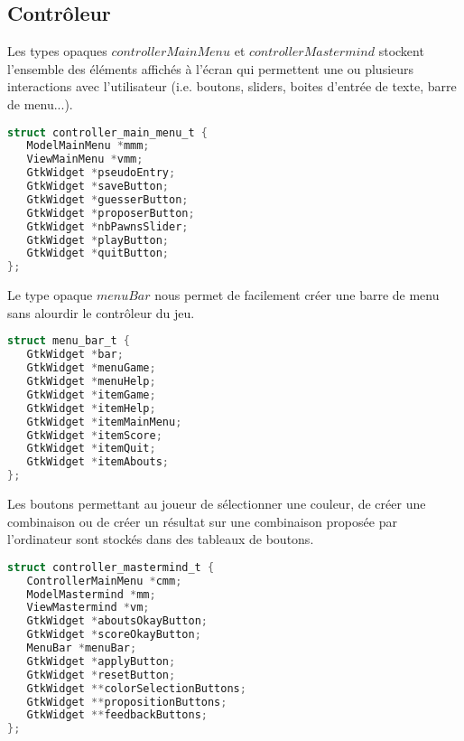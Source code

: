 \subsection{Contrôleur}

Les types opaques $controllerMainMenu$ et $controllerMastermind$ stockent l'ensemble des éléments affichés à l'écran qui permettent une ou plusieurs interactions avec l'utilisateur (i.e. boutons, sliders, boites d'entrée de texte, barre de menu...).

\begin{lstlisting}[language=C]
struct controller_main_menu_t {
   ModelMainMenu *mmm;
   ViewMainMenu *vmm;
   GtkWidget *pseudoEntry;
   GtkWidget *saveButton;
   GtkWidget *guesserButton;
   GtkWidget *proposerButton;
   GtkWidget *nbPawnsSlider;
   GtkWidget *playButton;
   GtkWidget *quitButton;
};
\end{lstlisting}

Le type opaque $menuBar$ nous permet de facilement créer une barre de menu sans alourdir le contrôleur du jeu. 

\begin{lstlisting}[language=C]
struct menu_bar_t {
   GtkWidget *bar;
   GtkWidget *menuGame;
   GtkWidget *menuHelp;
   GtkWidget *itemGame;
   GtkWidget *itemHelp;
   GtkWidget *itemMainMenu;
   GtkWidget *itemScore;
   GtkWidget *itemQuit;
   GtkWidget *itemAbouts;
};
\end{lstlisting}

Les boutons permettant au joueur de sélectionner une couleur, de créer une combinaison ou de créer un résultat sur une combinaison proposée par l'ordinateur sont stockés dans des tableaux de boutons. 

\begin{lstlisting}[language=C]
struct controller_mastermind_t {
   ControllerMainMenu *cmm;
   ModelMastermind *mm;
   ViewMastermind *vm;
   GtkWidget *aboutsOkayButton;
   GtkWidget *scoreOkayButton;
   MenuBar *menuBar;
   GtkWidget *applyButton;
   GtkWidget *resetButton;
   GtkWidget **colorSelectionButtons;
   GtkWidget **propositionButtons;
   GtkWidget **feedbackButtons;
};
\end{lstlisting}